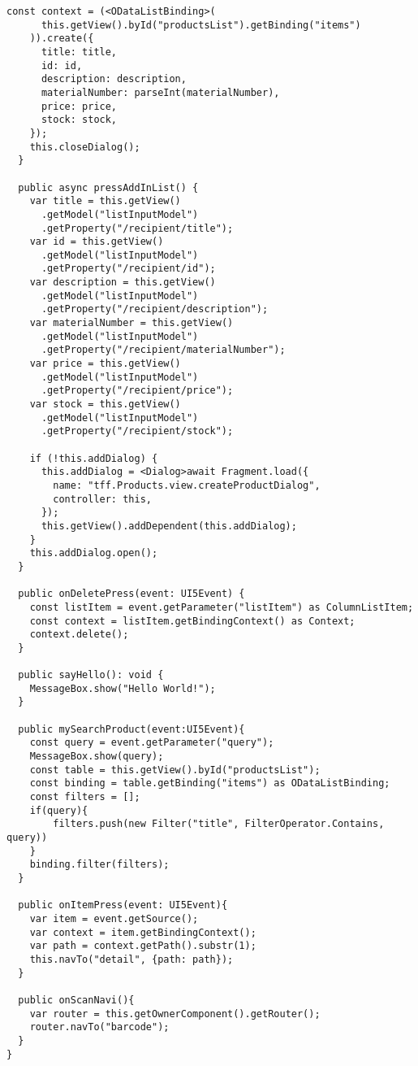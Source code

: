 \begin{mdframed}[backgroundcolor=mygrey2, leftmargin=0.5cm, hidealllines=true, innerleftmargin=3pt, innerrightmargin=0cm, innertopmargin=0cm, innerbottommargin=-3cm, splitbottomskip=0]
\begin{lstlisting}[emph={event, UI5Event, listItem, detail, path}, caption=Main Controller der Anwendung]
    const context = (<ODataListBinding>(
      this.getView().byId("productsList").getBinding("items")
    )).create({
      title: title,
      id: id,
      description: description,
      materialNumber: parseInt(materialNumber),
      price: price,
      stock: stock,
    });
    this.closeDialog();
  }

  public async pressAddInList() {
    var title = this.getView()
      .getModel("listInputModel")
      .getProperty("/recipient/title");
    var id = this.getView()
      .getModel("listInputModel")
      .getProperty("/recipient/id");
    var description = this.getView()
      .getModel("listInputModel")
      .getProperty("/recipient/description");
    var materialNumber = this.getView()
      .getModel("listInputModel")
      .getProperty("/recipient/materialNumber");
    var price = this.getView()
      .getModel("listInputModel")
      .getProperty("/recipient/price");
    var stock = this.getView()
      .getModel("listInputModel")
      .getProperty("/recipient/stock");

    if (!this.addDialog) {
      this.addDialog = <Dialog>await Fragment.load({
		name: "tff.Products.view.createProductDialog",
        controller: this,
      });
      this.getView().addDependent(this.addDialog);
    }
    this.addDialog.open();
  }

  public onDeletePress(event: UI5Event) {
    const listItem = event.getParameter("listItem") as ColumnListItem;
    const context = listItem.getBindingContext() as Context;
    context.delete();
  }

  public sayHello(): void {
    MessageBox.show("Hello World!");
  }

  public mySearchProduct(event:UI5Event){
	const query = event.getParameter("query");
	MessageBox.show(query);
	const table = this.getView().byId("productsList");
	const binding = table.getBinding("items") as ODataListBinding;
	const filters = [];
	if(query){
		filters.push(new Filter("title", FilterOperator.Contains, query))
	}
	binding.filter(filters);
  }

  public onItemPress(event: UI5Event){
    var item = event.getSource();
    var context = item.getBindingContext();
    var path = context.getPath().substr(1);
    this.navTo("detail", {path: path});
  }

  public onScanNavi(){
    var router = this.getOwnerComponent().getRouter();
    router.navTo("barcode");
  }
}
\end{lstlisting}
\end{mdframed}

